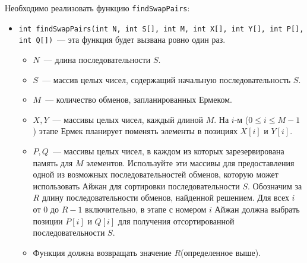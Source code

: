 Необходимо реализовать функцию \texttt{findSwapPairs}:
\begin{itemize}
\item \texttt{int findSwapPairs(int N, int S[], int M, int X[], int Y[], int P[], int Q[])}~--- эта функция будет вызвана ровно один
раз.
\begin{itemize}
\item $N$~--- длина последовательности $S$.
\item $S$~--- массив целых чисел, содержащий начальную последовательность $S$.
\item $M$~--- количество обменов, запланированных Ермеком. 
\item $X, Y$~--- массивы целых чисел, каждый длиной $M$. На $i$-м ($0 \le i \le M - 1$ ) этапе
Ермек планирует поменять элементы в позициях $X[i]$ и $Y[i]$.
\item $P, Q$~--- массивы целых чисел, в каждом из которых зарезервирована память для
$M$ элементов. Используйте эти массивы для предоставления одной из возможных
последовательностей обменов, которую может использовать Айжан для сортировки
последовательности $S$. Обозначим за $R$ длину последовательности обменов,
найденной решением. Для всех $i$ от $0$ до $R - 1$ включительно, в этапе с номером $i$
Айжан должна выбрать позиции $P[i]$ и $Q[i]$ для получения отсортированной
последовательности $S$.
\item Функция должна возвращать значение $R$(определенное выше).
\end{itemize}
\end{itemize}




